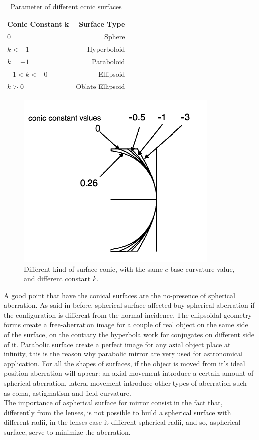 \begin{table}[ht]
	\centering
		\begin{tabular}{l|r}
			Conic Constant k & Surface Type\\
			\hline
			0 & Sphere \\
			$k < -1 $ & Hyperboloid \\
			$k = -1 $ & Paraboloid \\
			$-1 < k < -0 $ & Ellipsoid \\
			$k > 0 $ & Oblate Ellipsoid \\	
		\end{tabular}
	\caption{Parameter of different conic surfaces}
	\label{tab: conic surface}
\end{table}
\begin{figure}[]
%
\centering
%
\includegraphics[width=.4\textwidth]{Immagini/Chapter2/SurfaceConic1}
%
\caption{Different kind of surface conic, with the same $c $ base curvature value, and different constant $k $.}
%
\label{fig: SurfaceConic1}
%
\end{figure}
\noindent A good point that have the conical surfaces are the no-presence of spherical aberration. As said in before, spherical surface affected buy spherical aberration if the configuration is different from the normal incidence. The ellipsoidal geometry forms create a free-aberration image for a couple of real object on the same side of the surface, on the contrary the hyperbola work for conjugates on different side of it. Parabolic surface create a perfect image for any axial object place at infinity, this is the reason why parabolic mirror are very used for astronomical application. For all the shapes of surfaces, if the object is moved from it's ideal position aberration will appear: an axial movement introduce a certain amount of spherical aberration, lateral movement introduce other types of aberration such as coma, astigmatism and field curvature.
\\
\noindent The importance of aspherical surface for mirror consist in the fact that, differently from the lenses, is not possible to build a spherical surface with different radii, in the lenses case it different spherical radii, and so, aspherical surface, serve to minimize the aberration. 
